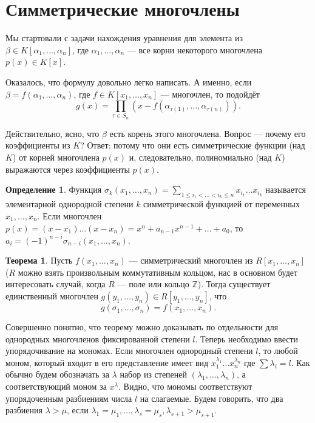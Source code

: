 \documentclass[10pt,a4paper,oneside]{book}
\theoremstyle{definition}
\newtheorem*{defn}{{\color{yellow!30!red} Определение}}
\newtheorem{thm}{{\color{red!40!black} Теорема}}
\newcommand{\mb}[1]{\mathbb{#1}}
\begin{document}
   









\section{Симметрические многочлены}

Мы стартовали с задачи нахождения уравнения для элемента из $\beta \in K[\alpha_1, \dots, \alpha_n]$, где $\alpha_1,\dots, \alpha_n$ --- все корни некоторого многочлена $p(x)\in K[x]$. 

Оказалось, что формулу довольно легко написать. А именно, если $\beta=f(\alpha_1, \dots, \alpha_n)$, где $f\in K[x_1,\dots,x_n]$ --- многочлен, то подойдёт
 $$g(x)=\prod_{\tau \in S_n} (x - f(\alpha_{\tau(1)}, \dots, \alpha_{\tau(n)})).$$

Действительно, ясно, что $\beta$ есть корень этого многочлена. Вопрос --- почему его коэффициенты из $K$? Ответ: потому что они есть симметрические функции (над $K$) от корней многочлена $p(x)$ и, следовательно, полиномиально (над $K$) выражаются через коэффициенты $p(x)$. 

\begin{defn}
Функция $\sigma_k(x_1,\dots, x_n)= \sum_{1\leq i_1<\dots<i_k\leq n}x_{i_1}\dots x_{i_k}$ называется элементарной однородной степени $k$ симметрической функцией от переменных $x_1,\dots, x_n$. Если многочлен $p(x)=(x-x_1)\dots(x-x_n)=x^n+a_{n-1}x^{n-1}+\dots+a_0$, то $a_i=(-1)^{n-i}\sigma_{n-i}(x_1,\dots, x_n)$.
\end{defn}

\begin{thm} Пусть $f(x_1,\dots, x_n)$ --- симметрический многочлен из $R[x_1,\dots, x_n]$ ($R$ можно взять произвольным коммутативным кольцом, нас в основном будет интересовать случай, когда $R$ --- поле или кольцо $\mb Z$). Тогда существует единственный многочлен $g(y_1, \dots, y_n)\in R[y_1,\dots, y_n]$, что  $$g(\sigma_1, \dots, \sigma_n)=f(x_1, \dots, x_n).$$
\end{thm}
\proof
Совершенно понятно, что теорему можно доказывать по отдельности для однородных многочленов фиксированной степени $l$. Теперь необходимо ввести упорядочивание на мономах. Если многочлен однородный степени $l$, то любой моном, который входит в его представление имеет вид $x_1^{\lambda_1}\dots x_n^{\lambda_n}$ где $\sum \lambda_i = l$. Как обычно будем обозначать за $\lambda$ набор из степеней $(\lambda_1,\dots,\lambda_n)$, а соответствующий моном за $x^{\lambda}$. Видно, что мономы соответствуют упорядоченным разбиениям числа $l$ на слагаемые. Будем говорить, что два разбиения $\lambda>\mu$, если $\lambda_1=\mu_1,\dots, \lambda_s=\mu_s, \lambda_{s+1}>\mu_{s+1}$.
\end{document}
